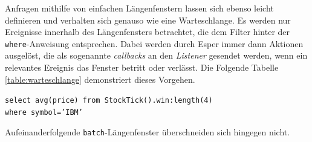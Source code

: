 \documentclass{acm_proc_article-sp}
\begin{document}
Anfragen mithilfe von einfachen Längenfenstern lassen sich ebenso leicht definieren und 
verhalten sich genauso wie eine Warteschlange. Es werden nur Ereignisse innerhalb des 
Längenfensters betrachtet, die dem Filter hinter der \texttt{where}-Anweisung 
entsprechen. Dabei werden durch Esper immer dann Aktionen ausgelöst, die als sogenannte 
\textit{callbacks} an den \textit{Listener} gesendet werden, wenn ein relevantes Ereignis 
das Fenster betritt oder verlässt. Die Folgende Tabelle \ref{table:warteschlange} 
demonstriert dieses Vorgehen.

\texttt{select avg(price) from StockTick().win:length(4)\\where symbol='IBM'}

\begin{table}[ht]
    \caption{Längenfenster}
    \label{table:warteschlange}\vspace{0.2cm}
\end{table}

Aufeinanderfolgende \texttt{batch}-Längenfenster überschneiden sich hingegen nicht.
\end{document}
